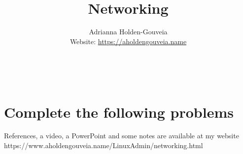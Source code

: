 \documentclass[12pt]{article}
\title{Networking}
\author{
        Adrianna Holden-Gouveia \\
        Website: \url{https://aholdengouveia.name}\\ 
        \date{\vspace{-5ex}}
        \faLinkedin{: aholdengouveia} \\
        \faGithub {: aholdengouveia} \\
        }
\begin{document}
    

\maketitle


\section*{Complete the following problems}

References, a video, a PowerPoint and some notes are available at my website
https://www.aholdengouveia.name/LinuxAdmin/networking.html
\end{document}

